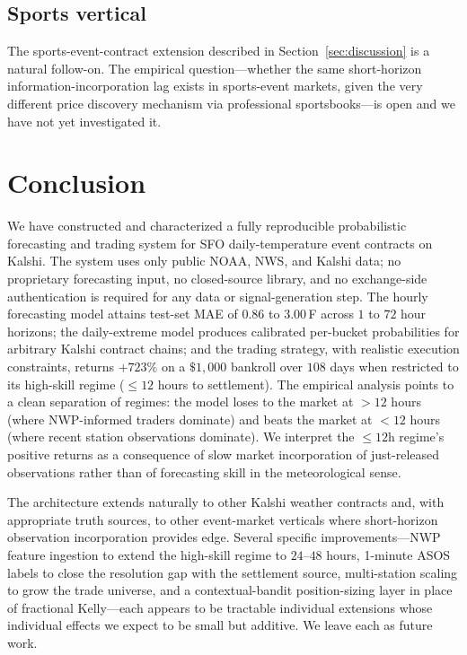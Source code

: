 \documentclass[11pt]{article}
\begin{document}
\subsection{Sports vertical}

The sports-event-contract extension described in
Section~\ref{sec:discussion} is a natural follow-on. The empirical
question---whether the same short-horizon information-incorporation lag
exists in sports-event markets, given the very different price discovery
mechanism via professional sportsbooks---is open and we have not yet
investigated it.

\section{Conclusion}

We have constructed and characterized a fully reproducible probabilistic
forecasting and trading system for SFO daily-temperature event contracts on
Kalshi. The system uses only public NOAA, NWS, and Kalshi data; no proprietary
forecasting input, no closed-source library, and no exchange-side
authentication is required for any data or signal-generation step. The
hourly forecasting model attains test-set MAE of $0.86$ to $3.00$\,\textdegree F
across $1$ to $72$ hour horizons; the daily-extreme model produces
calibrated per-bucket probabilities for arbitrary Kalshi contract chains;
and the trading strategy, with realistic execution constraints, returns
$+723\%$ on a $\$1{,}000$ bankroll over $108$ days when restricted to its
high-skill regime ($\le 12$ hours to settlement). The empirical analysis
points to a clean separation of regimes: the model loses to the market at
$> 12$ hours (where NWP-informed traders dominate) and beats the market at
$< 12$ hours (where recent station observations dominate). We interpret
the $\le 12$h regime's positive returns as a consequence of slow market
incorporation of just-released observations rather than of forecasting
skill in the meteorological sense.

The architecture extends naturally to other Kalshi weather contracts and,
with appropriate truth sources, to other event-market verticals where
short-horizon observation incorporation provides edge. Several specific
improvements---NWP feature ingestion to extend the high-skill regime to
$24$--$48$ hours, 1-minute ASOS labels to close the resolution gap with
the settlement source, multi-station scaling to grow the trade universe,
and a contextual-bandit position-sizing layer in place of fractional Kelly---each
appears to be tractable individual extensions whose individual effects we
expect to be small but additive. We leave each as future work.
\end{document}
